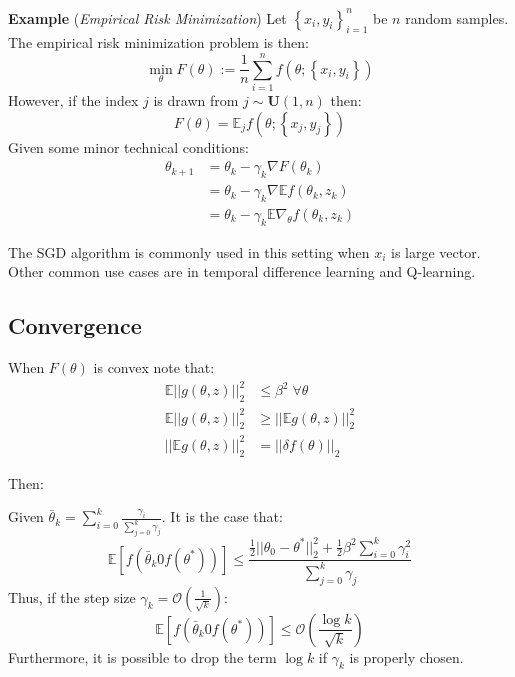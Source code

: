 \textbf{Example} (\textit{Empirical Risk Minimization}) Let $\left\{x_i, y_i\right\}_{i=1}^n$ be $n$ random samples. The empirical risk minimization problem is then:
\begin{equation*}
	\min_{\theta} F(\theta) := \frac{1}{n} \sum_{i=1}^n f(\theta; \left\{x_i, y_i\right\})
\end{equation*}
However, if the index $j$ is drawn from $j \sim \mathbf{U}(1,n)$ then:
\begin{equation*}
	F(\theta) = \mathbb{E}_j f(\theta; \left\{x_j, y_j\right\})
\end{equation*}
Given some minor technical conditions:
\begin{align*}
\theta_{k+1} &= \theta_k - \gamma_k \nabla F(\theta_k)\\
&= \theta_k - \gamma_k \nabla \mathbb{E}f(\theta_k, z_k)\\
&= \theta_k - \gamma_k \mathbb{E} \nabla_{\theta} f(\theta_k, z_k)
\end{align*}

The SGD algorithm is commonly used in this setting when $x_i$ is large vector. Other common use cases are in temporal difference learning and Q-learning. 

\subsection{Convergence}
When $F(\theta)$ is convex note that:
\begin{align*}
	\mathbb{E} || g(\theta, z) ||_2^2 &\leq \beta^2 \; \forall \theta\\
	\mathbb{E} || g(\theta, z) ||_2^2 &\geq ||\mathbb{E} g(\theta, z) ||_2^2\\
	||\mathbb{E} g(\theta, z) ||_2^2 &= ||\delta f(\theta)||_2
\end{align*}

Then:
\begin{theorem}
	Given $\bar{\theta}_k= \sum_{i=0}^k \frac{\gamma_i}{\sum_{j=0}^k \gamma_j}$. It is the case that: 
	\begin{equation*}
	\mathbb{E}\left[f(\bar{\theta}_k 0 f(\theta^*))\right] \leq \frac{\frac{1}{2} ||\theta_0 - \theta^*||_2^2 + \frac{1}{2}\beta^2 \sum_{i=0}^{k}\gamma_i^2}{\sum_{j=0}^k \gamma_j}
	\end{equation*}
	Thus, if the step size $\gamma_k= \mathcal{O}\left(\frac{1}{\sqrt{k}}\right)$:
	\begin{equation*}
		\mathbb{E}\left[f(\bar{\theta}_k 0 f(\theta^*))\right] \leq \mathcal{O}\left(\frac{\log k}{\sqrt{k}}\right)
	\end{equation*}
	Furthermore, it is possible to drop the term $\log k$ if $\gamma_k$ is properly chosen. 
	
\end{theorem}

